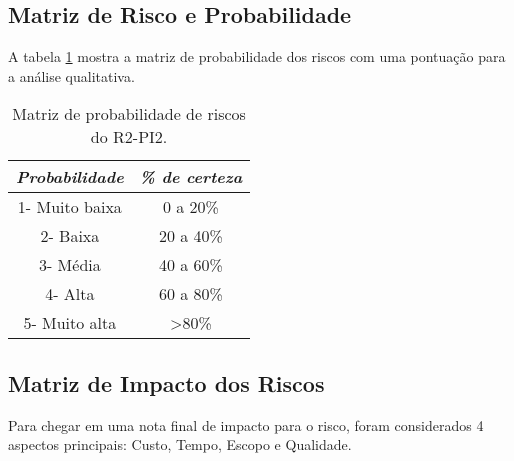  \subsection{Matriz de Risco e Probabilidade} %
 \label{sub:matriz_de_risco_e_probabilidade}

 A tabela \ref{tab:probabilidade} mostra a matriz de probabilidade dos riscos com uma pontuação para a análise qualitativa.

 \begin{table}[H]
	\centering
	\caption{Matriz de probabilidade de riscos do R2-PI2.}
	\label{tab:probabilidade}
	\begin{tabular}{|c|c|}
		\hline
		\rowcolor[HTML]{C0C0C0} 
		\textit{\textbf{Probabilidade}} & \textit{\textbf{\% de certeza}} \\ \hline
		1- Muito baixa                  & 0 a 20\%                        \\ \hline
		2- Baixa                        & 20 a 40\%                       \\ \hline
		3- Média                        & 40 a 60\%                       \\ \hline
		4- Alta                         & 60 a 80\%                       \\ \hline
		5- Muito alta                   & \textgreater80\%                \\ \hline
	\end{tabular}
\end{table}
 
 \subsection{Matriz de Impacto dos Riscos} %
 \label{sub:matriz_de_impacto_dos_riscos}
 
 Para chegar em uma nota final de impacto para o risco, foram considerados 4 aspectos principais: Custo, Tempo, Escopo e Qualidade.

